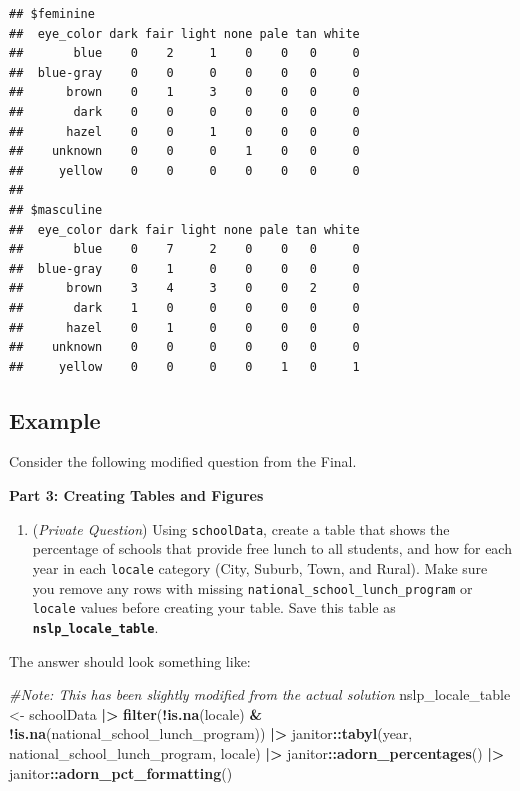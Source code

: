\documentclass[
  12pt,
]{book}
\newenvironment{Shaded}{\begin{snugshade}}{\end{snugshade}}
\newcommand{\CommentTok}[1]{\textcolor[rgb]{0.56,0.35,0.01}{\textit{#1}}}
\newcommand{\FunctionTok}[1]{\textcolor[rgb]{0.13,0.29,0.53}{\textbf{#1}}}
\newcommand{\NormalTok}[1]{#1}
\newcommand{\OtherTok}[1]{\textcolor[rgb]{0.56,0.35,0.01}{#1}}
\newcommand{\SpecialCharTok}[1]{\textcolor[rgb]{0.81,0.36,0.00}{\textbf{#1}}}
\providecommand{\tightlist}{%
  \setlength{\itemsep}{0pt}\setlength{\parskip}{0pt}}
\begin{document}
\begin{verbatim}
## $feminine
##  eye_color dark fair light none pale tan white
##       blue    0    2     1    0    0   0     0
##  blue-gray    0    0     0    0    0   0     0
##      brown    0    1     3    0    0   0     0
##       dark    0    0     0    0    0   0     0
##      hazel    0    0     1    0    0   0     0
##    unknown    0    0     0    1    0   0     0
##     yellow    0    0     0    0    0   0     0
## 
## $masculine
##  eye_color dark fair light none pale tan white
##       blue    0    7     2    0    0   0     0
##  blue-gray    0    1     0    0    0   0     0
##      brown    3    4     3    0    0   2     0
##       dark    1    0     0    0    0   0     0
##      hazel    0    1     0    0    0   0     0
##    unknown    0    0     0    0    0   0     0
##     yellow    0    0     0    0    1   0     1
\end{verbatim}

\subsection*{Example}\label{example}

Consider the following modified question from the Final.

\textbf{Part 3: Creating Tables and Figures}

\begin{enumerate}
\def\labelenumi{\arabic{enumi})}
\tightlist
\item
  (\emph{Private Question}) Using \texttt{schoolData}, create a table that shows the percentage of schools that provide free lunch to all students, and how for each year in each \texttt{locale} category (City, Suburb, Town, and Rural). Make sure you remove any rows with missing \texttt{national\_school\_lunch\_program} or \texttt{locale} values before creating your table. Save this table as \textbf{\texttt{nslp\_locale\_table}}.
\end{enumerate}

The answer should look something like:

\begin{Shaded}
\begin{Highlighting}[]
\CommentTok{\#Note: This has been slightly modified from the actual solution}
\NormalTok{nslp\_locale\_table }\OtherTok{\textless{}{-}}\NormalTok{ schoolData }\SpecialCharTok{|\textgreater{}} 
  \FunctionTok{filter}\NormalTok{(}\SpecialCharTok{!}\FunctionTok{is.na}\NormalTok{(locale) }\SpecialCharTok{\&} \SpecialCharTok{!}\FunctionTok{is.na}\NormalTok{(national\_school\_lunch\_program)) }\SpecialCharTok{|\textgreater{}} 
\NormalTok{  janitor}\SpecialCharTok{::}\FunctionTok{tabyl}\NormalTok{(year, national\_school\_lunch\_program, locale) }\SpecialCharTok{|\textgreater{}} 
\NormalTok{  janitor}\SpecialCharTok{::}\FunctionTok{adorn\_percentages}\NormalTok{() }\SpecialCharTok{|\textgreater{}} 
\NormalTok{  janitor}\SpecialCharTok{::}\FunctionTok{adorn\_pct\_formatting}\NormalTok{()}
\end{Highlighting}
\end{Shaded}
\end{document}
